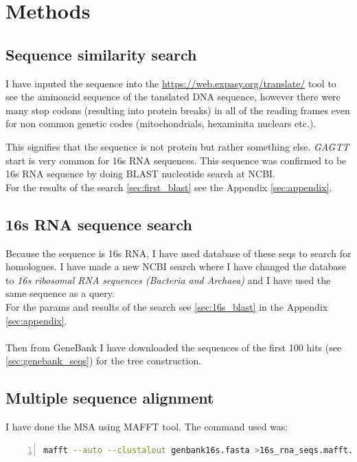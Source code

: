 \documentclass{article}
\begin{document}
\section{Methods}

\subsection{Sequence similarity search}

I have inputed the sequence into the \url{https://web.expasy.org/translate/} tool to see the aminoacid sequence of the tanslated DNA sequence, however there were many stop codons (resulting into protein breaks) in all of the reading frames even for non common genetic codes (mitochondrials, hexaminita nuclears etc.).

This signifies that the sequence is not protein but rather something else. \textit{GAGTT} start is very common for 16s RNA sequences. This sequence was confirmed to be 16s RNA sequence by doing BLAST nucleotide search at NCBI.
\\
For the results of the search \ref{sec:first_blast} see the Appendix \ref{sec:appendix}.

\subsection{16s RNA sequence search}

Because the sequence is 16s RNA, I have used database of these seqs to search for homologues. I have made a new NCBI search where I have changed the database to \textit{16s ribosomal RNA sequences (Bacteria and Archaea)} and I have used the same sequence as a query.
\\
For the params and results of the search see \ref{sec:16s_blast} in the Appendix \ref{sec:appendix}.
\\
\\
Then from GeneBank I have downloaded the sequences of the first 100 hits (see \ref{sec:genebank_seqs}) for the tree construction.

\subsection{Multiple sequence alignment}

I have done the MSA using MAFFT tool. The command used was:
\begin{lstlisting}[language=Bash, basicstyle=\ttfamily\small, keywordstyle=\color{blue}, stringstyle=\color{red}, commentstyle=\color{green}, showstringspaces=false, numbers=left, numberstyle=\tiny\color{gray}, breaklines=true, frame=single, inputencoding=utf8]
mafft --auto --clustalout genbank16s.fasta >16s_rna_seqs.mafft.clw
\end{lstlisting}
\end{document}
